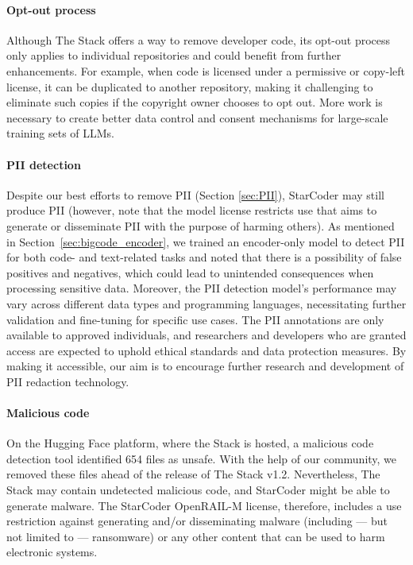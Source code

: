 \paragraph{Opt-out process} Although The Stack offers a way to remove developer code, its opt-out process only applies to individual repositories and could benefit from further enhancements. For example, when code is licensed under a permissive or copy-left license, it can be duplicated to another repository, making it challenging to eliminate such copies if the copyright owner chooses to opt out. More work is necessary to create better data control and consent mechanisms for large-scale training sets of LLMs. 

\paragraph{PII detection} Despite our best efforts to remove PII (Section \ref{sec:PII}), StarCoder may still produce PII (however, note that the model license restricts use that aims to generate or disseminate PII with the purpose of harming others). As mentioned in Section~\ref{sec:bigcode_encoder}, 
we trained an encoder-only model to detect PII for both code- and text-related tasks and noted that there is a possibility of false positives and negatives, which could lead to unintended consequences when processing sensitive data. Moreover, the PII detection model's performance may vary across different data types and programming languages, necessitating further validation and fine-tuning for specific use cases. The PII annotations are only available to approved individuals, and researchers and developers who are granted access are expected to uphold ethical standards and data protection measures. By making it accessible, our aim is to encourage further research and development of PII redaction technology. 

\paragraph{Malicious code} On the Hugging Face platform, where the Stack is hosted, a malicious code detection tool identified 654 files as unsafe. With the help of our community, we removed these files ahead of the release of The Stack v1.2. Nevertheless, The Stack may contain undetected malicious code, and StarCoder might be able to generate malware. The StarCoder OpenRAIL-M license, therefore, includes a use restriction against generating and/or disseminating malware (including --- but not limited to --- ransomware) or any other content that can be used to harm electronic systems.


